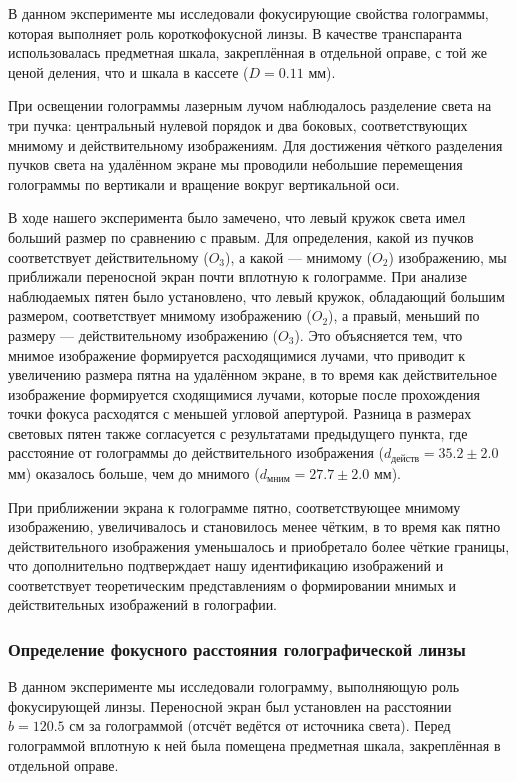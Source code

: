 В данном эксперименте мы исследовали фокусирующие свойства голограммы, которая выполняет роль короткофокусной линзы. В качестве транспаранта использовалась предметная шкала, закреплённая в отдельной оправе, с той же ценой деления, что и шкала в кассете ($D = 0.11$ мм).

При освещении голограммы лазерным лучом наблюдалось разделение света на три пучка: центральный нулевой порядок и два боковых, соответствующих мнимому и действительному изображениям. Для достижения чёткого разделения пучков света на удалённом экране мы проводили небольшие перемещения голограммы по вертикали и вращение вокруг вертикальной оси.

В ходе нашего эксперимента было замечено, что левый кружок света имел больший размер по сравнению с правым. Для определения, какой из пучков соответствует действительному ($O_3$), а какой — мнимому ($O_2$) изображению, мы приближали переносной экран почти вплотную к голограмме. При анализе наблюдаемых пятен было установлено, что левый кружок, обладающий большим размером, соответствует мнимому изображению ($O_2$), а правый, меньший по размеру — действительному изображению ($O_3$). Это объясняется тем, что мнимое изображение формируется расходящимися лучами, что приводит к увеличению размера пятна на удалённом экране, в то время как действительное изображение формируется сходящимися лучами, которые после прохождения точки фокуса расходятся с меньшей угловой апертурой. Разница в размерах световых пятен также согласуется с результатами предыдущего пункта, где расстояние от голограммы до действительного изображения ($d_{\text{действ}} = 35.2 \pm 2.0$ мм) оказалось больше, чем до мнимого ($d_{\text{мним}} = 27.7 \pm 2.0$ мм).

При приближении экрана к голограмме пятно, соответствующее мнимому изображению, увеличивалось и становилось менее чётким, в то время как пятно действительного изображения уменьшалось и приобретало более чёткие границы, что дополнительно подтверждает нашу идентификацию изображений и соответствует теоретическим представлениям о формировании мнимых и действительных изображений в голографии.

\subsubsection{Определение фокусного расстояния голографической линзы}

В данном эксперименте мы исследовали голограмму, выполняющую роль фокусирующей линзы. Переносной экран был установлен на расстоянии $b = 120.5$ см за голограммой (отсчёт ведётся от источника света). Перед голограммой вплотную к ней была помещена предметная шкала, закреплённая в отдельной оправе.

